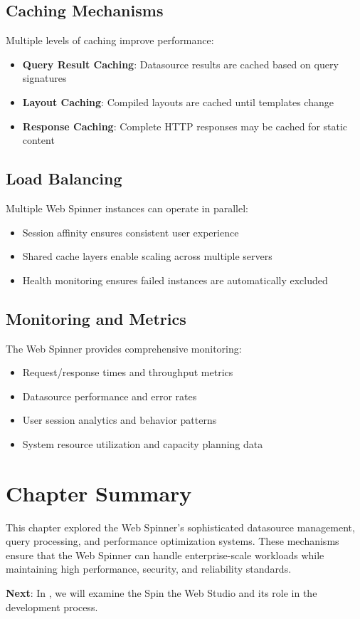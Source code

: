 \subsection{Caching Mechanisms}
Multiple levels of caching improve performance:
\begin{itemize}
\item \textbf{Query Result Caching}: Datasource results are cached based on query signatures
\item \textbf{Layout Caching}: Compiled layouts are cached until templates change
\item \textbf{Response Caching}: Complete HTTP responses may be cached for static content
\end{itemize}

\subsection{Load Balancing}
Multiple Web Spinner instances can operate in parallel:
\begin{itemize}
\item Session affinity ensures consistent user experience
\item Shared cache layers enable scaling across multiple servers
\item Health monitoring ensures failed instances are automatically excluded
\end{itemize}

\subsection{Monitoring and Metrics}
The Web Spinner provides comprehensive monitoring:
\begin{itemize}
\item Request/response times and throughput metrics
\item Datasource performance and error rates
\item User session analytics and behavior patterns
\item System resource utilization and capacity planning data
\end{itemize}

\section{Chapter Summary}

This chapter explored the Web Spinner's sophisticated datasource management, query processing, and performance optimization systems. These mechanisms ensure that the Web Spinner can handle enterprise-scale workloads while maintaining high performance, security, and reliability standards.

\textbf{Next}: In , we will examine the Spin the Web Studio and its role in the development process.
